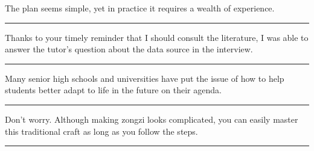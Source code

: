 \documentclass[11pt,a4paper]{article}
\newcommand{\num}[1]{\makebox[1.9em][r]{#1.}\hspace{0.3em}}
\newcommand{\wline}{\noindent\rule{\linewidth}{0.4pt}}
\begin{document}
\vspace{0.35em}\vspace{0.15em}

\begin{minipage}{\linewidth}

\num{9}The plan seems simple, yet in practice it requires a wealth of experience.

\vspace{0.25em}

\wline

\end{minipage}

\begin{minipage}{\linewidth}

\num{10}Thanks to your timely reminder that I should consult the literature, I was able to answer the tutor’s question about the data source in the interview.

\vspace{0.25em}

\wline

\end{minipage}

\begin{minipage}{\linewidth}

\num{11}Many senior high schools and universities have put the issue of how to help students better adapt to life in the future on their agenda.

\vspace{0.25em}

\wline

\end{minipage}

\begin{minipage}{\linewidth}

\num{12}Don’t worry. Although making zongzi looks complicated, you can easily master this traditional craft as long as you follow the steps.

\vspace{0.25em}

\wline

\end{minipage}
\end{document}

